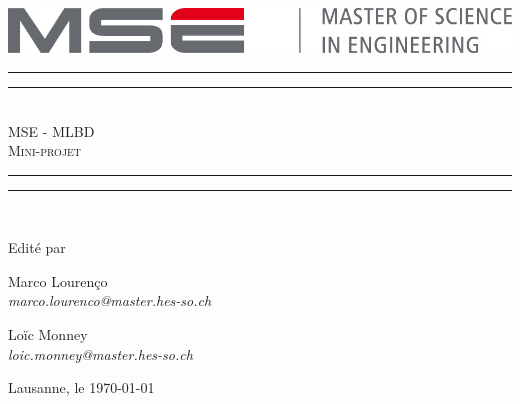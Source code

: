 \begingroup

\begin{center}
\vspace*{\baselineskip}
\vspace{1cm}
\centering
\includegraphics[width=\textwidth]{pictures/logo-mse.jpg}

\vspace{2cm}

\rule{\textwidth}{1.6pt}\vspace*{-\baselineskip}\vspace*{2pt} %
\rule{\textwidth}{0.4pt}\\[\baselineskip] %

{\LARGE \MakeUppercase{MSE - MLBD}}\\[0.2\baselineskip] %
\vspace{6pt}
{\LARGE \textsc{Mini-projet}}\\[0.2\baselineskip] %

\rule{\textwidth}{0.4pt}\vspace*{-\baselineskip}\vspace{3.2pt} %
\rule{\textwidth}{1.6pt}\\[\baselineskip] %
\scshape

\vspace{0.5cm}

\par
\vspace{2cm}

Edité par

\vspace{0.5cm}
{\Large Marco Lourenço} \\
{\itshape marco.lourenco@master.hes-so.ch }

\vspace{0.5cm}
{\Large Loïc Monney } \\
{\itshape loic.monney@master.hes-so.ch }

\vspace{3cm}

\vspace*{2\baselineskip}



\vfill
Lausanne, le {\today}
\end{center}
\clearpage

\endgroup

